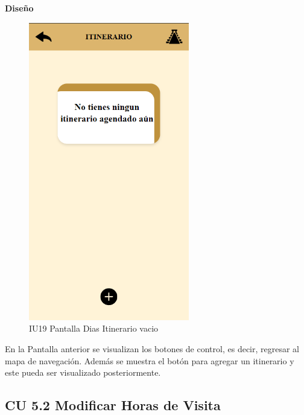 \textbf{Diseño}
\begin{figure}[h]
        \centering
        \includegraphics[width= 7cm]{entregable final/pantallasSistema/IU19 Pantalla Dias Itinerario vacio.png}
    \caption{IU19 Pantalla Dias Itinerario vacio}
        \label{fig:enter-label}
    \end{figure}
 

En la Pantalla anterior se visualizan los botones de control, es decir, regresar al mapa de navegación. Además se muestra el botón para agregar un itinerario y este pueda ser visualizado posteriormente.

\newpage




\pagebreak
\subsection{CU 5.2 Modificar Horas de Visita}

